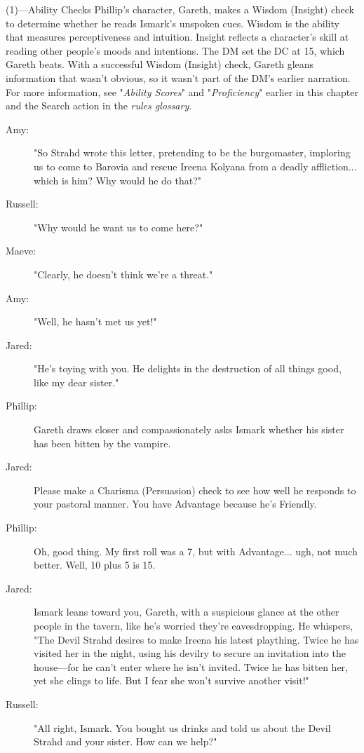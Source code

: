 \documentclass[10pt,a4paper,twoside,bg=print,twocolumn,openany,nodeprecatedcode]{dndbook}
\begin{document}
\begin{DndSidebar}[float=!b]{(1)—Ability Checks}
Phillip's character, Gareth, makes a Wisdom (Insight) check to determine whether he reads Ismark's unspoken cues. Wisdom is the ability that measures perceptiveness and intuition. Insight reflects a character's skill at reading other people's moods and intentions. The DM set the DC at 15, which Gareth beats. With a successful Wisdom (Insight) check, Gareth gleans information that wasn't obvious, so it wasn't part of the DM's earlier narration. For more information, see "\textit{Ability Scores}" and "\textit{Proficiency}" earlier in this chapter and the Search action in the \textit{rules glossary}.



\end{DndSidebar}


\begin{description}
\item[Amy:]
"So Strahd wrote this letter, pretending to be the burgomaster, imploring us to come to Barovia and rescue Ireena Kolyana from a deadly affliction... which is him? Why would he do that?"
\item[Russell:]
"Why would he want us to come here?"
\item[Maeve:]
"Clearly, he doesn't think we're a threat."
\item[Amy:]
"Well, he hasn't met us yet!"
\item[Jared:]
"He's toying with you. He delights in the destruction of all things good, like my dear sister."
\end{description}

{\par \vspace { 9pt plus 3pt minus 3pt } \noindent  {} \nopagebreak }

\begin{description}
\item[Phillip:]
Gareth draws closer and compassionately asks Ismark whether his sister has been bitten by the vampire.
\item[Jared:]
Please make a Charisma (Persuasion) check to see how well he responds to your pastoral manner. You have Advantage because he's Friendly.
\item[Phillip:]
Oh, good thing. My first roll was a 7, but with Advantage... ugh, not much better. Well, 10 plus 5 is 15.
\end{description}


\begin{description}
\item[Jared:]
Ismark leans toward you, Gareth, with a suspicious glance at the other people in the tavern, like he's worried they're eavesdropping. He whispers, "The Devil Strahd desires to make Ireena his latest plaything. Twice he has visited her in the night, using his devilry to secure an invitation into the house—for he can't enter where he isn't invited. Twice he has bitten her, yet she clings to life. But I fear she won't survive another visit!"
\item[Russell:]
"All right, Ismark. You bought us drinks and told us about the Devil Strahd and your sister. How can we help?"
\end{description}
\end{document}
